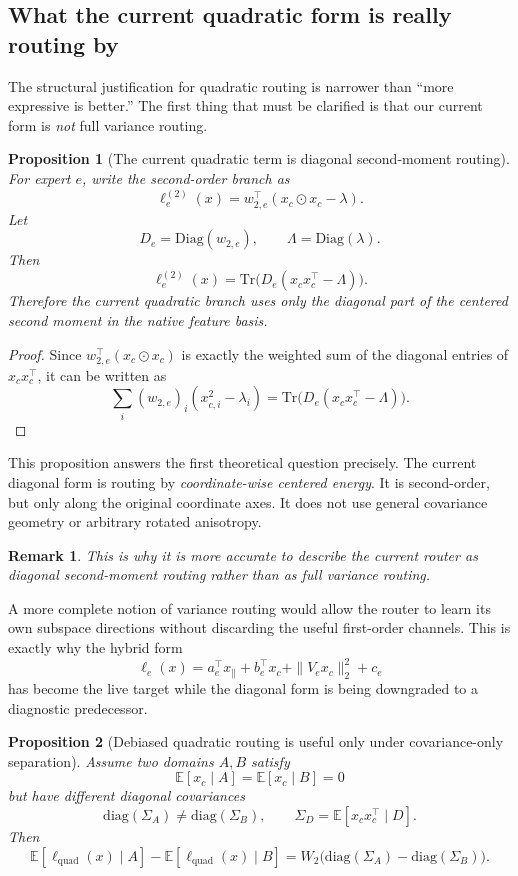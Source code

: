 \documentclass[11pt]{article}
\newtheorem{proposition}{Proposition}
\newtheorem{remark}{Remark}
\begin{document}
\subsection{What the current quadratic form is really routing by}

The structural justification for quadratic routing is narrower than ``more expressive is better.'' The first thing that must be clarified is that our current form is \emph{not} full variance routing.

\begin{proposition}[The current quadratic term is diagonal second-moment routing]
For expert $e$, write the second-order branch as
\[
\ell^{(2)}_e(x)
=
w_{2,e}^{\top}(x_c\odot x_c-\lambda).
\]
Let
\[
D_e=\mathrm{Diag}(w_{2,e}),
\qquad
\Lambda=\mathrm{Diag}(\lambda).
\]
Then
\[
\ell^{(2)}_e(x)
=
\mathrm{Tr}\!\big(D_e(x_cx_c^{\top}-\Lambda)\big).
\]
Therefore the current quadratic branch uses only the diagonal part of the centered second moment in the native feature basis.
\end{proposition}

\begin{proof}
Since $w_{2,e}^{\top}(x_c\odot x_c)$ is exactly the weighted sum of the diagonal entries of $x_cx_c^{\top}$, it can be written as
\[
\sum_i (w_{2,e})_i (x_{c,i}^2-\lambda_i)
=
\mathrm{Tr}\!\big(D_e(x_cx_c^\top-\Lambda)\big).
\]
\end{proof}

This proposition answers the first theoretical question precisely. The current diagonal form is routing by \emph{coordinate-wise centered energy}. It is second-order, but only along the original coordinate axes. It does not use general covariance geometry or arbitrary rotated anisotropy.

\begin{remark}
This is why it is more accurate to describe the current router as \emph{diagonal second-moment routing} rather than as full variance routing.
\end{remark}

A more complete notion of variance routing would allow the router to learn its own subspace directions without discarding the useful first-order channels. This is exactly why the hybrid form
\[
\ell_e(x)
=
a_e^\top x_{\parallel}
+
b_e^\top x_c
+
\|V_e x_c\|_2^2
+
c_e
\]
has become the live target while the diagonal form is being downgraded to a diagnostic predecessor.

\begin{proposition}[Debiased quadratic routing is useful only under covariance-only separation]
Assume two domains $A,B$ satisfy
\[
\mathbb{E}[x_c\mid A]=\mathbb{E}[x_c\mid B]=0
\]
but have different diagonal covariances
\[
\mathrm{diag}(\Sigma_A)\neq \mathrm{diag}(\Sigma_B),
\qquad
\Sigma_D=\mathbb{E}[x_cx_c^\top\mid D].
\]
Then
\[
\mathbb{E}[\ell_{\mathrm{quad}}(x)\mid A]-\mathbb{E}[\ell_{\mathrm{quad}}(x)\mid B]
=
W_2\big(\mathrm{diag}(\Sigma_A)-\mathrm{diag}(\Sigma_B)\big).
\]
\end{proposition}
\end{document}
